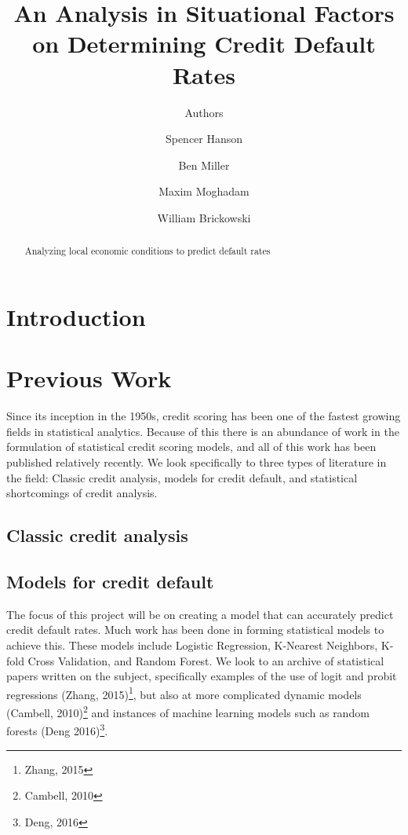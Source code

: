 \documentclass[sigconf, 11pt]{acmart}
\begin{document}
\title{An Analysis in Situational Factors on Determining Credit Default Rates}
\subtitle{Authors}

\author{Spencer Hanson}
\affiliation{}

\author{Ben Miller}
\affiliation{}

\author{Maxim Moghadam}
\affiliation{}

\author{William Brickowski}
\affiliation{}

\maketitle

\begin{abstract}
Analyzing local economic conditions to predict default rates
\end{abstract}

\section{Introduction}


\section{Previous Work}
Since its inception in the 1950s, credit scoring has been one of the fastest growing fields in statistical analytics. Because of this there is an abundance of work in the formulation of statistical credit scoring models, and all of this work has been published relatively recently. We look specifically to three types of literature in the field: Classic credit analysis, models for credit default, and statistical shortcomings of credit analysis.

\subsection{Classic credit analysis}

\subsection{Models for credit default}
The focus of this project will be on creating a model that can accurately predict credit default rates. Much work has been done in forming statistical models to achieve this. These models include Logistic Regression, K-Nearest Neighbors, K-fold Cross Validation, and Random Forest. We look to an archive of statistical papers written on the subject, specifically examples of the use of logit and probit regressions (Zhang, 2015)\footnote{Zhang, 2015}, but also at more complicated dynamic models (Cambell, 2010)\footnote{Cambell, 2010} and instances of machine learning models such as random forests (Deng 2016)\footnote{Deng, 2016}.
\end{document}
